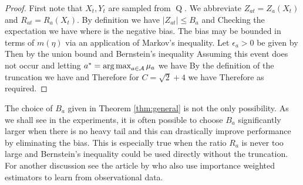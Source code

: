 \begin{proof}
First note that $X_t, Y_t$ are sampled from $\operatorname{Q}$.
We abbreviate $Z_{at} = Z_a(X_t)$ and $R_{at} = R_a(X_t)$.
By definition we have $|Z_{at}| \leq B_a$ and 
Checking the expectation we have
where 
is the negative bias. 
The bias may be bounded in terms of $m(\eta)$ via an application of Markov's inequality.
Let $\epsilon_a > 0$ be given by
Then by the union bound and Bernstein's inequality 
Assuming this event does not occur and letting $a^* = \argmax_{a \in \calA} \mu_a$ we have
By the definition of the truncation
we have
and
Therefore for $C = \sqrt{2} + 4$ we have
Therefore
as required.
\end{proof}

\begin{remark}\label{rem:truncate}
The choice of $B_a$ given in Theorem \ref{thm:general} is not the only possibility. As we shall see in the experiments, it is 
often possible to choose $B_a$ significantly
larger when there is no heavy tail and this can drastically improve performance by eliminating the bias. This is especially true when the ratio $R_a$ is never too large
and Bernstein's inequality could be used directly without the truncation. For another discussion see the article by \citet{BJQ13} who also use importance weighted estimators
to learn from observational data.
\end{remark}

